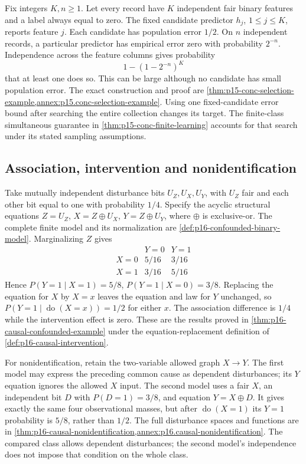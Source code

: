 Fix integers \(K,n\geq1\). Let every record have \(K\) independent fair
binary features and a label always equal to zero. The fixed candidate
predictor \(h_j\), \(1\leq j\leq K\), reports feature \(j\).
Each candidate has population error \(1/2\). On \(n\) independent
records, a particular predictor has empirical error zero with probability
\(2^{-n}\). Independence across the feature columns gives probability
\[
 1-(1-2^{-n})^K
\]
that at least one does so. This can be large although no candidate has
small population error. The exact construction and proof are
\cref{thm:p15-conc-selection-example,annex:p15.conc-selection-example}.
Using one fixed-candidate error bound after searching the entire collection
changes its target. The finite-class simultaneous guarantee in
\cref{thm:p15-conc-finite-learning} accounts for that search under its stated
sampling assumptions.

\subsection{Association, intervention and nonidentification}
\label{sec:p14-counter-causal}

Take mutually independent disturbance bits \(U_Z,U_X,U_Y\), with \(U_Z\)
fair and each other bit equal to one with probability \(1/4\). Specify the
acyclic structural equations \(Z=U_Z\), \(X=Z\oplus U_X\),
\(Y=Z\oplus U_Y\), where \(\oplus\)
is exclusive-or. The complete finite model and its normalization are
\cref{def:p16-confounded-binary-model}. Marginalizing \(Z\) gives
\[
\begin{array}{c|cc}
 &Y=0&Y=1\\\hline
 X=0&5/16&3/16\\
 X=1&3/16&5/16
\end{array}
\]
Hence \(P(Y=1\mid X=1)=5/8\),
\(P(Y=1\mid X=0)=3/8\). Replacing the equation for \(X\) by
\(X=x\) leaves the equation and law for \(Y\) unchanged, so
\(P(Y=1\mid\operatorname{do}(X=x))=1/2\) for either \(x\).
The association difference is \(1/4\) while the intervention effect is zero.
These are the results proved in \cref{thm:p16-causal-confounded-example}
under the equation-replacement definition of
\cref{def:p16-causal-intervention}\cite{Pearl2009CausalOverview}.

For nonidentification, retain the two-variable allowed graph \(X\to Y\).
The first model may express the preceding common cause as dependent
disturbances; its \(Y\) equation ignores the allowed \(X\) input.
The second model uses a fair \(X\), an independent bit \(D\) with
\(P(D=1)=3/8\), and equation \(Y=X\oplus D\). It gives exactly the
same four observational masses, but after \(\operatorname{do}(X=1)\)
its \(Y=1\) probability is \(5/8\), rather than \(1/2\).
The full disturbance spaces and functions are in
\cref{thm:p16-causal-nonidentification,annex:p16.causal-nonidentification}.
The compared class allows dependent disturbances; the second model's
independence does not impose that condition on the whole class.


